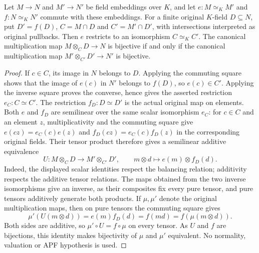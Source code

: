 \begin{lemma}
\label{fw:good-finite-field-isomorphism}
\leanok
Let $M\to N$ and $M'\to N'$ be field embeddings over $K$, and let
$e:M\simeq_K M'$ and $f:N\simeq_K N'$ commute with these embeddings.
For a finite original $K$-field $D\subseteq N$, put $D'=f(D)$,
$C=M\cap D$ and $C'=M'\cap D'$, with intersections interpreted as
original pullbacks. Then $e$ restricts to an isomorphism $C\simeq_K C'$.
The canonical multiplication map $M\otimes_C D\to N$ is bijective
if and only if the canonical multiplication map
$M'\otimes_{C'}D'\to N'$ is bijective.
\end{lemma}
\begin{proof}
If $c\in C$, its image in $N$ belongs to $D$. Applying the commuting
square shows that the image of $e(c)$ in $N'$ belongs to $f(D)$,
so $e(c)\in C'$. Applying the inverse square proves the converse,
hence gives the asserted restriction $e_C:C\simeq C'$.
The restriction $f_D:D\simeq D'$ is the actual original map on elements.
Both $e$ and $f_D$ are semilinear over the same scalar isomorphism
$e_C$: for $c\in C$ and an element $z$, multiplicativity and the
commuting square give $e(cz)=e_C(c)e(z)$ and
$f_D(cz)=e_C(c)f_D(z)$ in the corresponding original fields.
Their tensor product therefore gives a semilinear additive equivalence
\[
 U:M\otimes_C D\longrightarrow M'\otimes_{C'}D',
 \qquad m\otimes d\longmapsto e(m)\otimes f_D(d).
\]
Indeed, the displayed scalar identities respect the balancing relation;
additivity respects the additive tensor relations. The maps obtained
from the two inverse isomorphisms give an inverse, as their composites
fix every pure tensor, and pure tensors additively generate both
products. If $\mu,\mu'$ denote the original multiplication maps,
then on pure tensors the commuting square gives
\[
 \mu'(U(m\otimes d))=e(m)f_D(d)=f(md)=f(\mu(m\otimes d)).
\]
Both sides are additive, so $\mu'\circ U=f\circ\mu$ on every tensor.
As $U$ and $f$ are bijections, this identity makes bijectivity of
$\mu$ and $\mu'$ equivalent. No normality, valuation or APF hypothesis
is used.
\end{proof}

